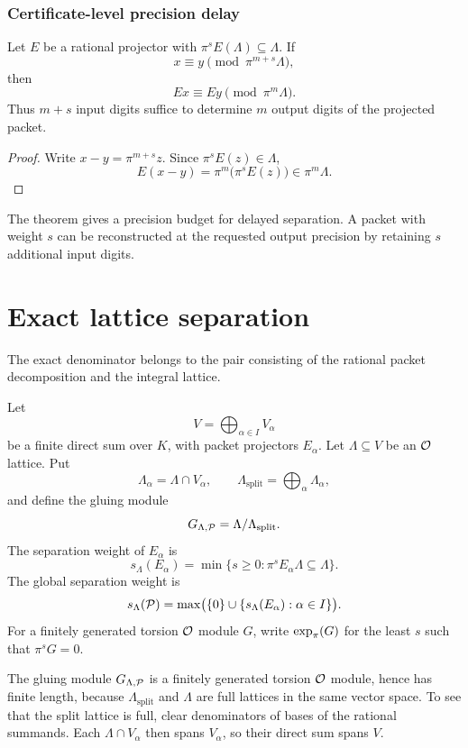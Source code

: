 \subsubsection{Certificate-level precision delay}

\begin{theorem}\label{thm:precision-delay}
Let $E$ be a rational projector with $\pi^sE(\Lambda)\subseteq\Lambda$. If
\[
x\equiv y\pmod{\pi^{m+s}\Lambda},
\]
then
\[
Ex\equiv Ey\pmod{\pi^m\Lambda}.
\]
Thus $m+s$ input digits suffice to determine $m$ output digits of the projected packet.
\end{theorem}

\begin{proof}
Write $x-y=\pi^{m+s}z$. Since $\pi^sE(z)\in\Lambda$,
\[
E(x-y)=\pi^m\bigl(\pi^sE(z)\bigr)\in\pi^m\Lambda.
\]
\end{proof}

The theorem gives a precision budget for delayed separation. A packet with weight $s$ can be reconstructed at the requested output precision by retaining $s$ additional input digits.


\section{Exact lattice separation}\label{sec:lattice}

The exact denominator belongs to the pair consisting of the rational packet decomposition and the integral lattice.

\begin{definition}\label{def:lattice_packet}
Let
\[
V=\bigoplus_{\alpha\in I}V_\alpha
\]
be a finite direct sum over $K$, with packet projectors $E_\alpha$.  Let $\Lambda\subseteq V$ be an ${\mathcal O}$ lattice.  Put
\[
\Lambda_\alpha=\Lambda\cap V_\alpha,
\qquad
\Lambda_{\mathrm{split}}=\bigoplus_\alpha\Lambda_\alpha,
\]
and define the gluing module
\[
G_{\Lambda,\mathcal P}
=
\Lambda/\Lambda_{\mathrm{split}}.
\]
The separation weight of $E_\alpha$ is
\[
s_\Lambda(E_\alpha)
=
\min\{s\geq0:\pi^sE_\alpha\Lambda\subseteq\Lambda\}.
\]
The global separation weight is
\[
s_\Lambda(\mathcal P)=\max\bigl(\{0\}\cup\{s_\Lambda(E_\alpha):\alpha\in I\}\bigr).
\]
For a finitely generated torsion ${\mathcal O}$ module $G$, write $\operatorname{exp}_\pi(G)$ for the least $s$ such that $\pi^sG=0$.
\end{definition}

The gluing module $G_{\Lambda,\mathcal P}$ is a finitely generated torsion ${\mathcal O}$ module, hence has finite length, because $\Lambda_{\mathrm{split}}$ and $\Lambda$ are full lattices in the same vector space. To see that the split lattice is full, clear denominators of bases of the rational summands. Each $\Lambda\cap V_\alpha$ then spans $V_\alpha$, so their direct sum spans $V$.

